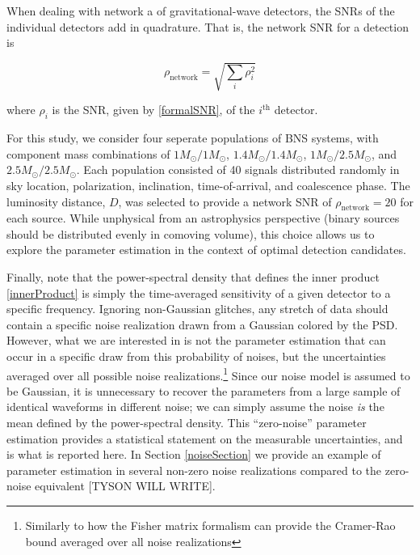 \documentclass[11pt,a4paper]{emulateapj}
\newcommand{\carl}[1]{{\color{red}  #1}}
\begin{document}
When dealing with network a of gravitational-wave detectors, the SNRs of the individual detectors add in quadrature.  That is, the network SNR for a detection is

\begin{equation}
\rho_{\text{network}} = \sqrt{\sum_i \rho_{i}^2}
\label{SNRnetwork}
\end{equation}

\noindent where $\rho_i$ is the SNR, given by \eqref{formalSNR}, of the $i^{\text{th}}$ detector.

For this study, we consider four seperate populations of BNS systems, with component mass 
combinations of $1M_{\odot}/1M_{\odot}$, $1.4M_{\odot}/1.4M_{\odot}$, $1M_{\odot}/2.5M_{\odot}$, 
and $2.5M_{\odot}/2.5M_{\odot}$.  Each population consisted of 40 signals distributed randomly
in sky location, polarization, inclination, time-of-arrival, and coalescence phase.  The luminosity 
distance, $D$, was selected to provide a network SNR of $\rho_{\text{network}}=20$ for each source.
While unphysical from an astrophysics perspective (binary sources should be 
distributed evenly in comoving volume), this choice allows us to explore the parameter estimation
in the context of optimal detection candidates. 

Finally, note that the power-spectral density that defines the inner product \eqref{innerProduct} is simply 
the time-averaged sensitivity of a given detector to a specific frequency.  Ignoring non-Gaussian glitches,
 any stretch of data should contain a specific noise realization drawn from a Gaussian colored by the PSD.
   However, what we are interested in is not the parameter estimation that can occur in a specific draw
    from this probability of noises, but the uncertainties averaged over all possible noise
     realizations.\footnote{Similarly to how the Fisher matrix formalism can provide the Cramer-Rao bound averaged over
     all noise realizations} Since our noise model is assumed to be Gaussian, it is unnecessary to recover the
      parameters from a large sample of identical waveforms in different noise; we can simply assume the 
      noise \emph{is} the mean defined by the power-spectral density.  This ``zero-noise'' parameter estimation
       provides a statistical statement on the measurable uncertainties, and is what is reported here.  In Section
        \ref{noiseSection} we provide an example of parameter estimation in several non-zero noise realizations
compared to the zero-noise equivalent \carl{[TYSON WILL WRITE]}. 
\end{document}
